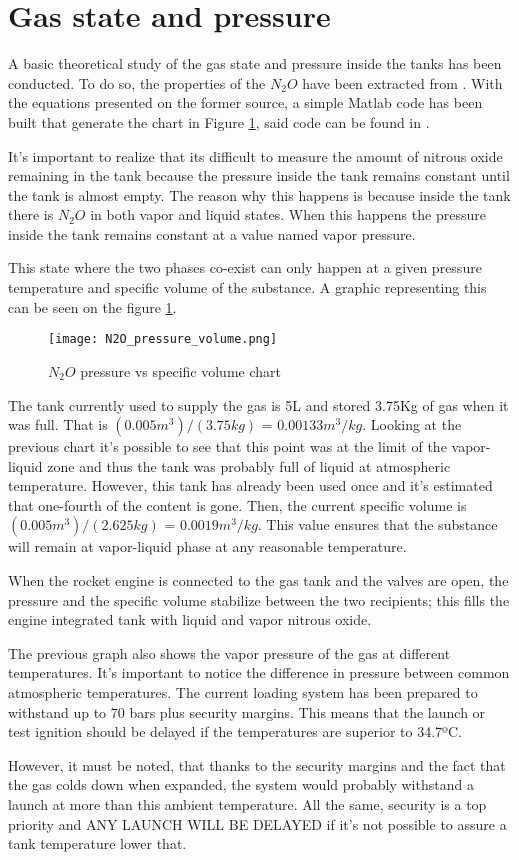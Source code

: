 
\section*{Gas state and pressure}

A basic theoretical study of the gas state and pressure inside the tanks has been conducted. To do so, the properties of the $N_2O$ have been extracted from \cite{n2oReference}. With the equations presented on the former source, a simple Matlab code has been built that generate the chart in Figure \ref{fig:N2O_P_V_graph}, said code can be found in \cite{MatlabPVchart}.

It's important to realize that its difficult to measure the amount of nitrous oxide remaining in the tank because the pressure inside the tank remains constant until the tank is almost empty. The reason why this happens is because inside the tank there is $N_2O$ in both vapor and liquid states. When this happens the pressure inside the tank remains constant at a value named vapor pressure.

This state where the two phases co-exist can only happen at a given pressure temperature and specific volume of the substance. A graphic representing this can be seen on the figure \ref{fig:N2O_P_V_graph}.

\begin{figure}[h]
  \centering
  \texttt{[image: N2O\_pressure\_volume.png]}
  \caption{$N_2O$ pressure vs specific volume chart}
  \label{fig:N2O_P_V_graph}
\end{figure}

The tank currently used to supply the gas is 5L and stored 3.75Kg of gas when it was full. That is $(0.005 m^3) / (3.75 kg)$ = $0.00133 m^3/kg$. Looking at the previous chart it's possible to see that this point was at the limit of the vapor-liquid zone and thus the tank was probably full of liquid at atmospheric temperature. However, this tank has already been used once and it's estimated that one-fourth of the content is gone. Then, the current specific volume is $(0.005 m^3) / (2.625 kg)$ = $0.0019 m^3/kg$. This value ensures that the substance will remain at vapor-liquid phase at any reasonable temperature.

When the rocket engine is connected to the gas tank and the valves are open, the pressure and the specific volume stabilize between the two recipients; this fills the engine integrated tank with liquid and vapor nitrous oxide.

The previous graph also shows the vapor pressure of the gas at different temperatures. It's important to notice the difference in pressure between common atmospheric temperatures. The current loading system has been prepared to withstand up to 70 bars plus security margins. This means that the launch or test ignition should be delayed if the temperatures are superior to 34.7ºC.

However, it must be noted, that thanks to the security margins and the fact that the gas colds down when expanded, the system would probably withstand a launch at more than this ambient temperature. All the same, security is a top priority and ANY LAUNCH WILL BE DELAYED if it's not possible to assure a tank temperature lower that.